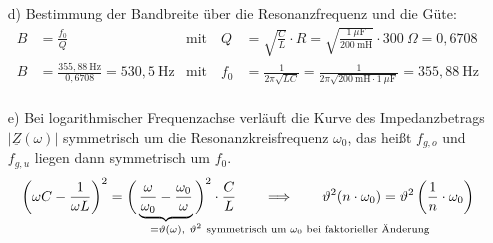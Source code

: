 {\begin{itemize}
\begin{align*}
        \omega{g,o} &= 4,4556 \cdot 10^3 \mathrm{s}^{-1} \qquad f_{g,o} = 709,12\ \mathrm{Hz}\\
        \omega{g,u} &= 1,1222 \cdot 10^3 \mathrm{s}^{-1} \qquad f_{g,u} = 178,60\ \mathrm{Hz}\\[4pt]
        B &= f_{g,o} - f_{g,u} = 530,5\,\mathrm{Hz}
    \end{align*}
    \item[d)] Bestimmung der Bandbreite über die Resonanzfrequenz und die Güte:
    \begin{align*}
        B &= \frac{f_0}{Q}
            & \text{mit}\quad Q &= \sqrt{\frac{C}{L}}\cdot R = \sqrt{\frac{1\ \mu\mathrm{F}}{200\ \mathrm{mH}}} \cdot 300\ \Omega = 0,6708 \\
        B &= \frac{355,88\ \mathrm{Hz}}{0,6708} = 530,5\ \mathrm{Hz}
            & \text{mit}\quad f_0 &= \frac{1}{2\pi\sqrt{LC}} = \frac{1}{2\pi\sqrt{200\ \mathrm{mH} \cdot 1\ \mu\mathrm{F}}} = 355,88\ \mathrm{Hz} \\
    \end{align*}
    \item[e)] Bei logarithmischer Frequenzachse verläuft die Kurve des Impedanzbetrags $|\underline{Z}(\omega)|$
    symmetrisch um die Resonanzkreisfrequenz $\omega_0$, das heißt $f_{g,o}$ und $f_{g,u}$ liegen dann symmetrisch um $f_0$.
    \begin{equation*}
        \left(\omega C - \frac{1}{\omega L}\right)^2 = \bigg(\underbrace{
            \frac{\omega}{\omega_0} - \frac{\omega_0}{\omega}
        }_{=\vartheta(\omega)\mathrlap{,\ \vartheta^2\ \text{symmetrisch um }\omega_0\text{ bei faktorieller Änderung}}}
        \bigg)^2\cdot\frac{C}{L}
        \qquad \Longrightarrow \qquad \vartheta^2(n\cdot\omega_0) = \vartheta^2\left(\frac{1}{n}\cdot\omega_0\right)
    \end{equation*}
\end{itemize}
}


